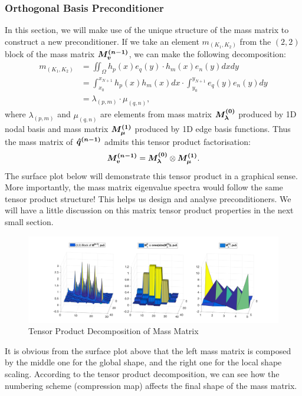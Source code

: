 \subsubsection{Orthogonal Basis Preconditioner}
In this section, we will make use of the unique structure of the mass matrix to construct a new preconditioner. If we take an element $m_{(K_1,K_2)}$ from the $(2,2)$ block of the mass matrix $\boldsymbol{M_v^{(n-1)}}$, we can make the following decomposition:
\begin{subequations}
	\begin{align}
		m_{(K_1,K_2)} &= \iint_{\Omega} h_p(x)e_q(y) \cdot h_m(x)e_n(y) dxdy \\
		&= \int_{x_0}^{x_{N+1}} h_p(x)h_m(x) dx  \cdot \int_{y_0}^{y_{N+1}} e_q(y)e_n(y) dy \\
		&= \lambda _{(p,m)} \cdot \mu _{(q,n)},
	\end{align}
\end{subequations}
where $\lambda_{(p,m)}$ and $\mu _{(q,n)}$ are elements from mass matrix $\boldsymbol{M_{\lambda}^{(0)}}$ produced by 1D nodal basis and mass matrix $\boldsymbol{M_{\mu}^{(1)}}$ produced by 1D edge basis functions. Thus the mass matrix of $\boldsymbol{\hat{q}^{(n-1)}}$ admits this tensor product factorisation:
\begin{equation}
	\boldsymbol{M_v^{(n-1)}} = \boldsymbol{M_{\lambda}^{(0)}} \otimes \boldsymbol{M_{\mu}^{(1)}}.
\end{equation}
The surface plot below will demonstrate this tensor product in a graphical sense. More importantly, the mass matrix eigenvalue spectra would follow the same tensor product structure! This helps us design and analyse preconditioners. We will have a little discussion on this matrix tensor product properties in the next small section. \\
  
\begin{figure}[H]
	\centering
	\includegraphics[width=\textwidth]{Tensor_product}
	\caption{Tensor Product Decomposition of Mass Matrix}
	\label{TensorDecompo}
\end{figure} 
It is obvious from the surface plot above that the left mass matrix is composed by the middle one for the global shape, and the right one for the local shape scaling. According to the tensor product decomposition, we can see how the numbering scheme (compression map) affects the final shape of the mass matrix. \\

